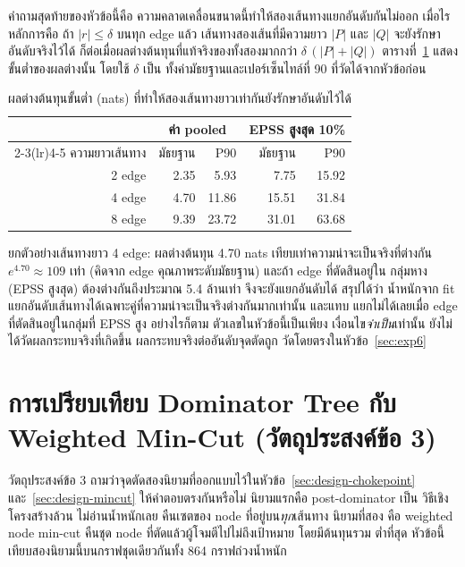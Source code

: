คำถามสุดท้ายของหัวข้อนี้คือ ความคลาดเคลื่อนขนาดนี้ทำให้สองเส้นทางแยกอันดับกันไม่ออก
เมื่อไร หลักการคือ ถ้า $|r|\le\delta$ บนทุก edge แล้ว เส้นทางสองเส้นที่มีความยาว $|P|$ และ
$|Q|$ จะยังรักษาอันดับจริงไว้ได้ ก็ต่อเมื่อผลต่างต้นทุนที่แท้จริงของทั้งสองมากกว่า
$\delta\,(|P|+|Q|)$ ตารางที่~\ref{tab:order} แสดงขั้นต่ำของผลต่างนั้น โดยใช้ $\delta$ เป็น
ทั้งค่ามัธยฐานและเปอร์เซ็นไทล์ที่ 90 ที่วัดได้จากหัวข้อก่อน

\begin{table}[H]
\centering
\caption{ผลต่างต้นทุนขั้นต่ำ (nats) ที่ทำให้สองเส้นทางยาวเท่ากันยังรักษาอันดับไว้ได้}\label{tab:order}
\small
\begin{tabular}{rrrrr}
\toprule
& \multicolumn{2}{c}{ค่า pooled} & \multicolumn{2}{c}{EPSS สูงสุด 10\%} \\
\cmidrule(lr){2-3}\cmidrule(lr){4-5}
ความยาวเส้นทาง & มัธยฐาน & P90 & มัธยฐาน & P90 \\
\midrule
2 edge & 2.35 & 5.93 & 7.75 & 15.92 \\
4 edge & 4.70 & 11.86 & 15.51 & 31.84 \\
8 edge & 9.39 & 23.72 & 31.01 & 63.68 \\
\bottomrule
\end{tabular}
\end{table}

ยกตัวอย่างเส้นทางยาว 4 edge: ผลต่างต้นทุน 4.70 nats เทียบเท่าความน่าจะเป็นจริงที่ต่างกัน
$e^{4.70} \approx 109$ เท่า (คิดจาก edge คุณภาพระดับมัธยฐาน) และถ้า edge ที่ตัดสินอยู่ใน
กลุ่มหาง (EPSS สูงสุด) ต้องต่างกันถึงประมาณ 5.4 ล้านเท่า จึงจะยังแยกอันดับได้ สรุปได้ว่า
น้ำหนักจาก fit แยกอันดับเส้นทางได้เฉพาะคู่ที่ความน่าจะเป็นจริงต่างกันมากเท่านั้น และแทบ
แยกไม่ได้เลยเมื่อ edge ที่ตัดสินอยู่ในกลุ่มที่ EPSS สูง อย่างไรก็ตาม ตัวเลขในหัวข้อนี้เป็นเพียง
เงื่อนไข\emph{จำเป็น}เท่านั้น ยังไม่ได้วัดผลกระทบจริงที่เกิดขึ้น ผลกระทบจริงต่ออันดับจุดตัดถูก
วัดโดยตรงในหัวข้อ~\ref{sec:exp6}

\section{การเปรียบเทียบ Dominator Tree กับ Weighted Min-Cut (วัตถุประสงค์ข้อ 3)}\label{sec:eval-cut}

วัตถุประสงค์ข้อ 3 ถามว่าจุดตัดสองนิยามที่ออกแบบไว้ในหัวข้อ~\ref{sec:design-chokepoint}
และ~\ref{sec:design-mincut} ให้คำตอบตรงกันหรือไม่ นิยามแรกคือ post-dominator เป็น
วิธีเชิงโครงสร้างล้วน ไม่อ่านน้ำหนักเลย คืนเซตของ node ที่อยู่บน\emph{ทุก}เส้นทาง นิยามที่สอง
คือ weighted node min-cut คืนชุด node ที่ตัดแล้วผู้โจมตีไปไม่ถึงเป้าหมาย โดยมีต้นทุนรวม
ต่ำที่สุด หัวข้อนี้เทียบสองนิยามนี้บนกราฟชุดเดียวกันทั้ง 864 กราฟถ่วงน้ำหนัก

